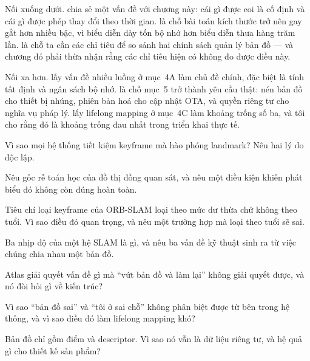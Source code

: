\documentclass[../../vslam.tex]{subfiles}
\begin{document}
Nối xuống dưới.  chia sẻ một vấn đề với chương này: cái gì được coi là cố định và cái gì được phép thay đổi theo thời gian.  là chỗ bài toán kích thước trở nên gay gắt hơn nhiều bậc, vì biểu diễn dày tốn bộ nhớ hơn biểu diễn thưa hàng trăm lần.  là chỗ ta cần các chỉ tiêu để so sánh hai chính sách quản lý bản đồ --- và chương đó phải thừa nhận rằng các chỉ tiêu hiện có không đo được điều này.

Nối xa hơn.  lấy vấn đề nhiều luồng ở mục~4A làm chủ đề chính, đặc biệt là tính tất định và ngân sách bộ nhớ.  là chỗ mục~5 trở thành yêu cầu thật: nén bản đồ cho thiết bị nhúng, phiên bản hoá cho cập nhật OTA, và quyền riêng tư cho nghĩa vụ pháp lý.  lấy lifelong mapping ở mục~4C làm khoảng trống số ba, và tôi cho rằng đó là khoảng trống đau nhất trong triển khai thực tế.

\begin{tukiem}
\item Vì sao mọi hệ thống tiết kiệm keyframe mà hào phóng landmark? Nêu hai lý do độc lập.
\item Nêu gốc rễ toán học của đồ thị đồng quan sát, và nêu một điều kiện khiến phát biểu đó không còn đúng hoàn toàn.
\item Tiêu chí loại keyframe của ORB-SLAM loại theo mức dư thừa chứ không theo tuổi. Vì sao điều đó quan trọng, và nêu một trường hợp mà loại theo tuổi sẽ sai.
\item Ba nhịp độ của một hệ SLAM là gì, và nêu ba vấn đề kỹ thuật sinh ra từ việc chúng chia nhau một bản đồ.
\item Atlas giải quyết vấn đề gì mà ``vứt bản đồ và làm lại'' không giải quyết được, và nó đòi hỏi gì về kiến trúc?
\item Vì sao ``bản đồ sai'' và ``tôi ở sai chỗ'' không phân biệt được từ bên trong hệ thống, và vì sao điều đó làm lifelong mapping khó?
\item Bản đồ chỉ gồm điểm và descriptor. Vì sao nó vẫn là dữ liệu riêng tư, và hệ quả gì cho thiết kế sản phẩm?
\end{tukiem}
\ifSubfilesClassLoaded{\printbibliography[title={Nguồn}]}{}
\end{document}
